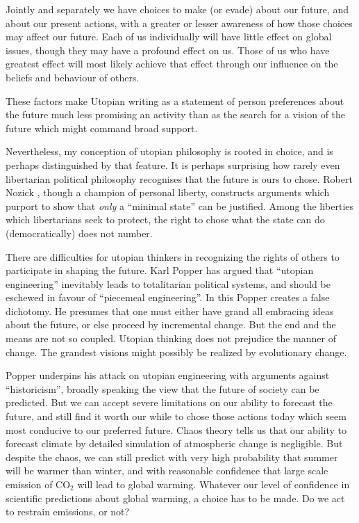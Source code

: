 Jointly and separately we have choices to make (or evade) about our future, and about our present actions, with a greater or lesser awareness of how those choices may affect our future.
Each of us individually will have little effect on global issues, though they may have a profound effect on us.
Those of us who have greatest effect will most likely achieve that effect through our influence on the beliefs and behaviour of others.

These factors make Utopian writing as a statement of person preferences about the future much less promising an activity than as the search for a vision of the future which might command broad support.

Nevertheless, my conception of utopian philosophy is rooted in choice, and is perhaps distinguished by that feature.
It is perhaps surprising how rarely even libertarian political philosophy recognises that the future is ours to chose.
Robert Nozick \cite{nozickASU}, though a champion of personal liberty, constructs arguments which purport to show that {\it only} a ``minimal state'' can be justified.
Among the liberties which libertarians seek to protect, the right to chose what the state can do (democratically) does not number.

There are difficulties for utopian thinkers in recognizing the rights of others to participate in shaping the future.
Karl Popper has argued \cite{popperPOH} that ``utopian engineering'' inevitably leads to totalitarian political systems, and should be eschewed in favour of ``piecemeal engineering''.
In this Popper creates a false dichotomy.
He presumes that one must either have grand all embracing ideas about the future, or else proceed by incremental change.
But the end and the means are not so coupled.
Utopian thinking does not prejudice the manner of change.
The grandest visions might possibly be realized by evolutionary change.

Popper underpins his attack on utopian engineering with arguments against ``historicism'', broadly speaking the view that the future of society can be predicted.
But we can accept severe limitations on our ability to forecast the future, and still find it worth our while to chose those actions today which seem most conducive to our preferred future.
Chaos theory tells us that our ability to forecast climate by detailed simulation of atmospheric change is negligible.
But despite the chaos, we can still predict with very high probability that summer will be warmer than winter, and with reasonable confidence that large scale emission of CO$_2$ will lead to global warming.
Whatever our level of confidence in scientific predictions about global warming, a choice has to be made.
Do we act to restrain emissions, or not?

